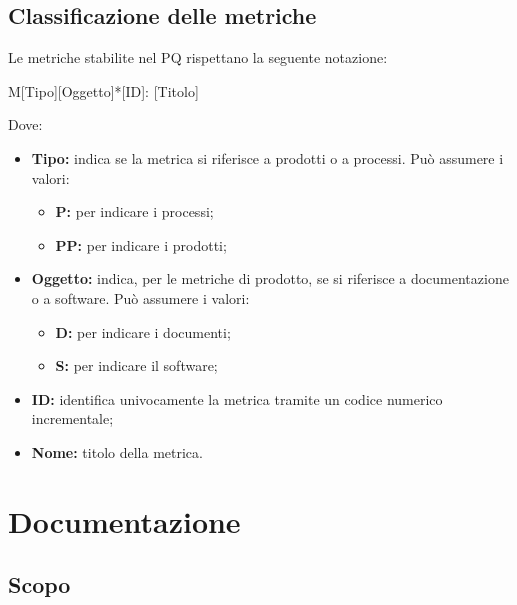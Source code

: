 \documentclass[../NormediProgetto.tex]{subfiles}
\begin{document}
\subsection{Classificazione delle metriche}

Le metriche stabilite nel PQ rispettano la seguente notazione:

    \begin{center}
        M[Tipo][Oggetto]*[ID]: [Titolo]
    \end{center}
    
Dove:

\begin{itemize}
    \item \textbf{Tipo:} indica se la metrica si riferisce a prodotti o a processi. Può assumere i valori:
    
    \begin{itemize}
        \item \textbf{P:} per indicare i processi;
        \item \textbf{PP:} per indicare i prodotti;
    \end{itemize}
    
    \item \textbf{Oggetto:} indica, per le metriche di prodotto, se si riferisce a documentazione o a software. Può assumere i valori:
    
    \begin{itemize}
        \item \textbf{D:} per indicare i documenti;
        \item \textbf{S:} per indicare il software;
    \end{itemize}
    
    \item \textbf{ID:} identifica univocamente la metrica tramite un codice numerico incrementale;
    
    \item \textbf{Nome:} titolo della metrica.
\end{itemize}


\section{Documentazione}

\subsection{Scopo} 
\end{document}
